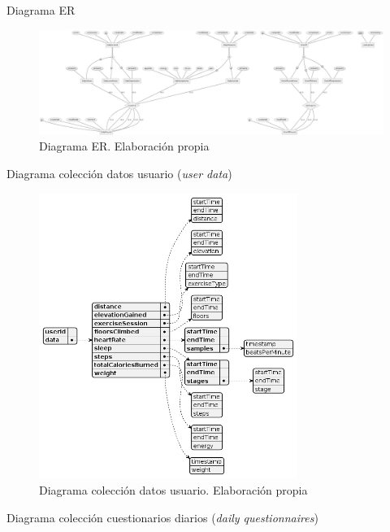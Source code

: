 Diagrama ER

\begin{figure}
    \centering
    \includegraphics[width=1\textwidth]{figures/bd/ER simple.png}
    \caption[Diagrama ER]{Diagrama ER. Elaboración propia}
    \label{figure:disenio:diagrama_er}
\end{figure}

Diagrama colección datos usuario (\textit{user data})

\begin{figure}[h]
    \centering
    \includegraphics[width=0.75\textwidth]{figures/bd/Servidor user data.png}
    \caption[Diagrama colección datos usuario]{Diagrama colección datos usuario. Elaboración propia}
    \label{figure:disenio:diagrama_user_data}
\end{figure}

Diagrama colección cuestionarios diarios (\textit{daily questionnaires})

